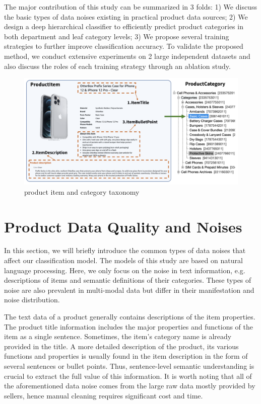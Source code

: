 \documentclass[11pt,dvipsnames]{article}
\begin{document}
The major contribution of this study can be summarized in 3 folds: 1) We discuss the basic types of data noises existing in practical product data sources; 2) We design a deep hierarchical classifier to efficiently predict product categories in both department and leaf category levels; 3) We propose several training strategies to further improve classification accuracy. To validate the proposed method, we conduct extensive experiments on 2 large independent datasets and also discuss the roles of each training strategy through an ablation study.  

\begin{figure}[h]
\center
        \includegraphics[width=0.8\linewidth]{submissions/bert_pt/figures/Data_Category-pdf.png}
    \caption{product item and category taxonomy}
    \label{fig:itemexample}
\end{figure}

\section{Product Data Quality and Noises}\label{sec:noise}
In this section, we will briefly introduce the common types of data noises that affect our classification model. The models of this study are based on natural language processing. Here, we only focus on the noise in text information, e.g. descriptions of items and semantic definitions of their categories. These types of noise are also prevalent in multi-modal data but differ in their manifestation and noise distribution. 

The text data of a product generally contains descriptions of the item properties. The product title information includes the major properties and functions of the item as a single sentence. Sometimes, the item’s category name is already provided in the title. A more detailed description of the product, its various functions and properties is usually found in the item description in the form of several sentences or bullet points. Thus, sentence-level semantic understanding is crucial to extract the full value of this information. It is worth noting that all of the aforementioned data noise comes from the large raw data mostly provided by sellers, hence manual cleaning requires significant cost and time. 
\end{document}
